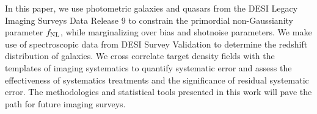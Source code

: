 In this paper, we use photometric galaxies and quasars from the DESI Legacy Imaging Surveys Data Release 9 to constrain the primordial non-Gaussianity parameter $f_{\rm NL}$, while marginalizing over bias and shotnoise parameters. We make use of spectroscopic data from DESI Survey Validation to determine the redshift distribution of galaxies. We cross correlate target density fields with the templates of imaging systematics to quantify systematic error and assess the effectiveness of systematics treatments and the significance of residual systematic error. The methodologies and statistical tools presented in this work will pave the path for future imaging surveys. 